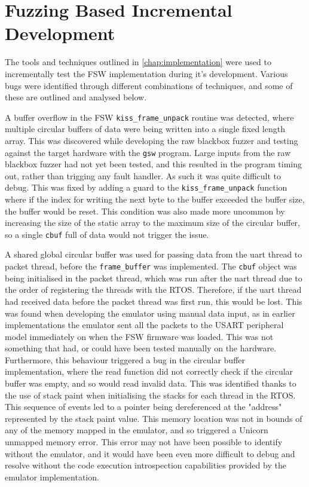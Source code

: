 \documentclass[../report.tex]{subfiles}
\begin{document}
\section{Fuzzing Based Incremental Development}

The tools and techniques outlined in \autoref{chap:implementation} were used to
incrementally test the FSW implementation during it's development. Various bugs
were identified through different combinations of techniques, and some of these
are outlined and analysed below.

A buffer overflow in the FSW \lstinline|kiss_frame_unpack| routine was
detected, where multiple circular buffers of data were being written into a
single fixed length array. This was discovered while developing the raw
blackbox fuzzer and testing against the target hardware with the
\lstinline|gsw| program. Large inputs from the raw blackbox fuzzer had not yet
been tested, and this resulted in the program timing out, rather than trigging
any fault handler. As such it was quite difficult to debug. This was fixed by
adding a guard to the \lstinline|kiss_frame_unpack| function where if the index
for writing the next byte to the buffer exceeded the buffer size, the buffer
would be reset. This condition was also made more uncommon by increasing the
size of the static array to the maximum size of the circular buffer, so a
single \lstinline|cbuf| full of data would not trigger the issue.


A shared global circular buffer was used for passing data from the uart thread
to packet thread, before the \lstinline|frame_buffer| was implemented. The
\lstinline|cbuf| object was being initialised in the packet thread, which was
run after the uart thread due to the order of registering the threads with the
RTOS. Therefore, if the uart thread had received data before the packet thread
was first run, this would be lost. This was found when developing the emulator
using manual data input, as in earlier implementations the emulator sent all
the packets to the USART peripheral model immediately on when the FSW firmware
was loaded. This was not something that had, or could have been tested manually
on the hardware. Furthermore, this behaviour triggered a bug in the circular
buffer implementation, where the read function did not correctly check if the
circular buffer was empty, and so would read invalid data. This was identified
thanks to the use of stack paint when initialising the stacks for each thread
in the RTOS. This sequence of events led to a pointer being dereferenced at the
"address" represented by the stack paint value. This memory location was not in
bounds of any of the memory mapped in the emulator, and so triggered a Unicorn
unmapped memory error. This error may not have been possible to identify
without the emulator, and it would have been even more difficult to debug and
resolve without the code execution introspection capabilities provided by the
emulator implementation.
\end{document}
